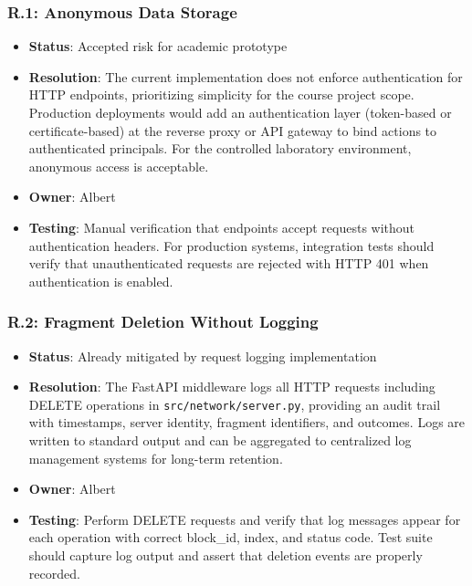 \documentclass[../veristore_security_model.tex]{subfiles}
\begin{document}
\subsubsection{R.1: Anonymous Data Storage}
\begin{itemize}
\item \textbf{Status}: Accepted risk for academic prototype
\item \textbf{Resolution}: The current implementation does not enforce authentication for HTTP endpoints, prioritizing simplicity for the course project scope. Production deployments would add an authentication layer (token-based or certificate-based) at the reverse proxy or API gateway to bind actions to authenticated principals. For the controlled laboratory environment, anonymous access is acceptable.
\item \textbf{Owner}: Albert
\item \textbf{Testing}: Manual verification that endpoints accept requests without authentication headers. For production systems, integration tests should verify that unauthenticated requests are rejected with HTTP 401 when authentication is enabled.
\end{itemize}

\subsubsection{R.2: Fragment Deletion Without Logging}
\begin{itemize}
\item \textbf{Status}: Already mitigated by request logging implementation
\item \textbf{Resolution}: The FastAPI middleware logs all HTTP requests including DELETE operations in \texttt{src/network/server.py}, providing an audit trail with timestamps, server identity, fragment identifiers, and outcomes. Logs are written to standard output and can be aggregated to centralized log management systems for long-term retention.
\item \textbf{Owner}: Albert
\item \textbf{Testing}: Perform DELETE requests and verify that log messages appear for each operation with correct block\_id, index, and status code. Test suite should capture log output and assert that deletion events are properly recorded.
\end{itemize}
\end{document}

